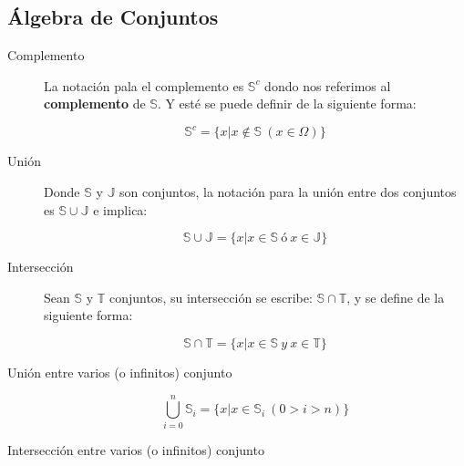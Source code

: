 \documentclass[a4paper,dvipsnames]{book}
\begin{document}
    \subsection{Álgebra de Conjuntos}


    \begin{description}
        \item[Complemento] La notación pala el complemento es $\mathbb S^{c}$
            dondo nos referimos al \textbf{complemento} de $\mathbb S$. Y esté
            se puede definir de la siguiente forma:

            \begin{equation*}

                \mathbb S^{c} = \{x|x\not\in \mathbb S\ (x\in \Omega)\}
            \end{equation*}

        \item[Unión] Donde $\mathbb S$ y $\mathbb J$ son conjuntos, la notación
            para la unión entre dos conjuntos es $\mathbb S\cup \mathbb J$ e
            implica:

            \begin{equation*}

                \mathbb S\cup \mathbb J = \{x|x\in \mathbb S\ ó\ x\in \mathbb J\}
            \end{equation*}

        \item[Intersección] Sean $\mathbb S$ y $\mathbb T$ conjuntos, su
            intersección se escribe: $\mathbb S\cap \mathbb T$, y se define de
            la siguiente forma:

            \begin{equation*}

                \mathbb S \cap \mathbb T = \{x|x\in \mathbb S\ y\ x\in \mathbb T\}
            \end{equation*}

        \item[Unión entre varios (o infinitos) conjunto]
            \begin{equation*}

                \bigcup_{i=0}^{n}\mathbb S_{i} = \{x|x\in \mathbb S_{i}\ (0>i>n)\}
            \end{equation*}

        \item[Intersección entre varios (o infinitos) conjunto]
            \begin{equation*}


\end{equation*}
\end{description}
\end{document}
